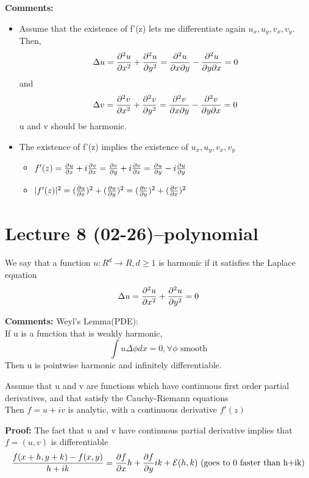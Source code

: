 \textbf{Comments:}
\begin{itemize}
\item Assume that the existence of f'(z) lets me differentiate again $ u_x,u_y,v_x,v_y $. Then,
$$
    \Delta u=\pdv[2]{u}{x}+\pdv[2]{u}{y}=\pdv{u}{x}{y}-\pdv{u}{y}{x}=0
$$ and$$
    \Delta v=\pdv[2]{v}{x}+\pdv[2]{v}{y}=\pdv{v}{x}{y}-\pdv{v}{y}{x}=0
$$ 
u and v should be harmonic.
\item The existence of f'(z) implies the existence of $ u_x,u_y,v_x,v_y $ 
\begin{itemize}
\item  $ f'(z)=\pdv{u}{x}+i\pdv{v}{x}=\pdv{v}{y}+i\pdv{v}{x}=\pdv{u}{y}-i\pdv{u}{y} $
\item  $ |f'(z)|^2=(\pdv{u}{x})^2+(\pdv{u}{y})^2=(\pdv{v}{y})^2+(\pdv{v}{x})^2 $ 
\end{itemize}
\end{itemize}

\section{Lecture 8 (02-26)--{polynomial}}
\begin{definition}{}
We say that a function $ u:R^d\rightarrow R ,d\geq1$ is harmonic if it satisfies the Laplace equation$$
    \Delta u=\pdv[2]{u}{x}+\pdv[2]{u}{y}=0$$
\end{definition}
\textbf{Comments:}
Weyl's Lemma(PDE):
\\If u is a function that is weakly harmonic, $$
    \int u \Delta \phi dx=0 ,\forall \phi \text{ smooth}
$$ 
Then u is pointwise harmonic and infinitely differentiable.
\begin{lemma}[]{}
Assume that u and v are functions which have continuous first order partial derivatives, and that satisfy the Cauchy-Riemann equations\\
Then $f=u+iv $ is analytic, with a continuous derivative $f'(z)$
\end{lemma}
\textbf{Proof:}
The fact that u and v have continuous partial derivative implies that $ f=(u,v) $ is differentiable$$
    \frac{f(x+h,y+k)-f(x,y)}{h+ik}=\pdv{f}{x}h+\pdv{f}{y}ik+\mathcal{E}(h,k)\text{ (goes to 0 faster than h+ik)}
$$  
